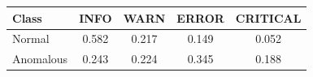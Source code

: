 \begin{tabular}{@{}lcccc@{}}
\toprule
Class & INFO & WARN & ERROR & CRITICAL \\
\midrule
Normal & 0.582 & 0.217 & 0.149 & 0.052 \\
Anomalous & 0.243 & 0.224 & 0.345 & 0.188 \\
\bottomrule
\end{tabular}

